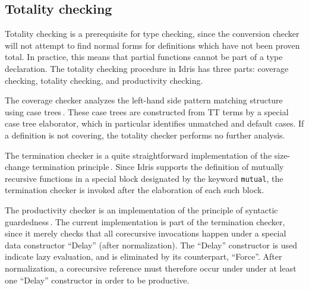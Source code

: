 
\subsection{Totality checking}
Totality checking is a prerequisite for type checking, since the conversion
checker will not attempt to find normal forms for definitions which have not
been proven total. In practice, this means that partial functions cannot be part
of a type declaration. The totality
checking procedure in Idris has three parts: coverage checking, totality
checking, and productivity checking.

The coverage checker analyzes the left-hand side pattern matching structure
using case trees\,\citep{Augustsson:1985}. These case trees are constructed from
TT terms by a special case tree elaborator, which in particular identifies
unmatched and default cases. If a definition is not covering, the totality
checker performs no further analysis.

The termination checker is a quite straightforward implementation of the
size-change termination principle\,\citep{LeeJones01SizeChange}. Since Idris
supports the definition of mutually recursive functions in a special block
designated by the keyword \texttt{mutual}, the termination checker
is invoked after the elaboration of each such block.

The productivity checker is an implementation of the principle of
syntactic guardedness\,\citep{Coquand94}. The current implementation is
part of the termination checker, since it merely checks that all
corecursive invocations happen under a special data constructor
``Delay'' (after normalization). The ``Delay'' constructor is used indicate lazy
evaluation, and is eliminated by its counterpart, ``Force''. After normalization,
a corecursive reference must therefore occur under under at least one
``Delay'' constructor in order to be productive.

